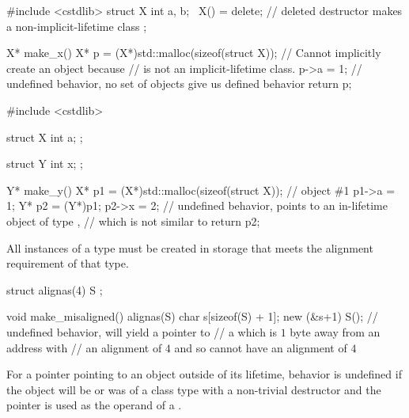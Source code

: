 \pnum
\begin{example}
\begin{codeblock}
#include <cstdlib>
struct X {
  int a, b;
  ~X() = delete;        // deleted destructor makes  a non-implicit-lifetime class
};

X* make_x() {
  X* p = (X*)std::malloc(sizeof(struct X));     // Cannot implicitly create an object because 
                                                // is not an implicit-lifetime class.
  p->a = 1;     // undefined behavior, no set of objects give us defined behavior
  return p;
}
\end{codeblock}
\end{example}
\begin{example}
\begin{codeblock}
#include <cstdlib>

struct X {
  int a;
};

struct Y {
  int x;
};

Y* make_y() {
  X* p1 = (X*)std::malloc(sizeof(struct X));    // object \#1
  p1->a = 1;
  Y* p2 = (Y*)p1;
  p2->x = 2;    // undefined behavior,  points to an in-lifetime object of type ,
                // which is not similar to 
  return p2;
}
\end{codeblock}
\end{example}


\pnum
All instances of a type must be created in storage
that meets the alignment requirement of that type.

\pnum
\begin{example}
\begin{codeblock}
struct alignas(4) S {};

void make_misaligned()
{
    alignas(S) char s[sizeof(S) + 1];
    new (&s+1) S();     // undefined behavior,  will yield a pointer to
                        // a  which is $1$ byte away from an address with
                        // an alignment of $4$ and so cannot have an alignment of $4$
}
\end{codeblock}
\end{example}


\pnum
For a pointer pointing to an object outside of its lifetime,
behavior is undefined if the object will be or was of a class type
with a non-trivial destructor
and the pointer is used as the operand of a .

